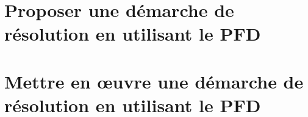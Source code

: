 \graphicspath{{\repStyle/png/}{../DYN/DYN-04-TorseurDynamique/64_EPAS/images/}} 
 
 
\clearpage 
\newpage 
\section{Proposer une démarche de résolution en utilisant le PFD} 
\graphicspath{{\repStyle/png/}{../DYN/DYN-05-Methode/01_T/images/}} 
 
 
\graphicspath{{\repStyle/png/}{../DYN/DYN-05-Methode/02_R/images/}} 
 
 
\graphicspath{{\repStyle/png/}{../DYN/DYN-05-Methode/03_TT/images/}} 
 
 
\graphicspath{{\repStyle/png/}{../DYN/DYN-05-Methode/04_RR/images/}} 
 
 
\graphicspath{{\repStyle/png/}{../DYN/DYN-05-Methode/05_RT/images/}} 
 
 
\graphicspath{{\repStyle/png/}{../DYN/DYN-05-Methode/06_TR/images/}} 
 
 
\graphicspath{{\repStyle/png/}{../DYN/DYN-05-Methode/07_RR3D/images/}} 
 
 
\graphicspath{{\repStyle/png/}{../DYN/DYN-05-Methode/08_RR3D/images/}} 
 
 
\graphicspath{{\repStyle/png/}{../DYN/DYN-05-Methode/09_RT_RSG/images/}} 
 
 
\graphicspath{{\repStyle/png/}{../DYN/DYN-05-Methode/46_RR_RSG/images/}} 
 
 
\clearpage 
\newpage 
\section{Mettre en œuvre une démarche de résolution en utilisant le PFD} 
\graphicspath{{\repStyle/png/}{../DYN/DYN-06-PFD/01_T/images/}} 
 
 
\graphicspath{{\repStyle/png/}{../DYN/DYN-06-PFD/02_R/images/}} 
 
 
